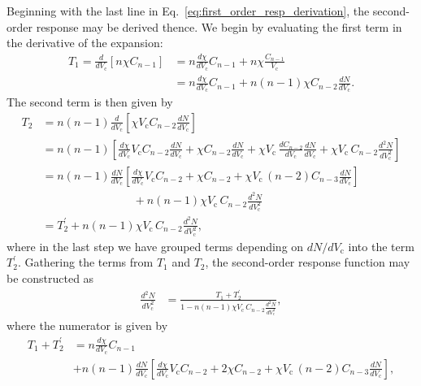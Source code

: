 Beginning with the last line in   
Eq.~\eqref{eq:first_order_resp_derivation}, 
the second-order response may be derived thence.
%
We begin by evaluating the 
first term in the derivative of the expansion:
%
\begin{align}
T_1=\frac{d}{dV_\textrm{c}}\left[n\chi C_{n-1}\right]
&=n\frac{d\chi}{dV_\textrm{c}}C_{n-1}+n\chi\frac{C_{n-1}}{V_\textrm{c}}\nonumber \\[1em]
&=n\frac{d\chi}{dV_\textrm{c}}C_{n-1}+n(n-1)\chi C_{n-2}\frac{dN}{dV_\textrm{c}}.
\end{align}
%
The second term is then given by
%
\begin{align}
T_2&=n(n-1)\frac{d}{dV_\textrm{c}}\left[\chi V_\textrm{c}C_{n-2}\frac{dN}{dV_\textrm{c}}\right] \nonumber \\[1em]
%
&=n(n-1)\left[\frac{d\chi}{dV_\textrm{c}}V_\textrm{c}C_{n-2}\frac{dN}{dV_\textrm{c}}
+ \chi C_{n-2}\frac{dN}{dV_\textrm{c}}\right.+\left.\chi V_\textrm{c}\,\frac{dC_{n-2}}{dV_\textrm{c}}\frac{dN}{dV_\textrm{c}}+\chi V_\textrm{c}\,C_{n-2}\frac{d^2N}{dV_\textrm{c}^2}\right] \nonumber  \\[1em]
%
&=n(n-1)\frac{dN}{dV_\textrm{c}}\left[\frac{d\chi}{dV_\textrm{c}}V_\textrm{c}C_{n-2}
+ \chi C_{n-2}
+\chi V_\textrm{c}\,(n-2)C_{n-3}\frac{dN}{dV_\textrm{c}}\right] \nonumber \\
&\qquad\qquad\qquad\qquad +n(n-1)\chi V_\textrm{c}\, C_{n-2}\frac{d^2N}{dV_\textrm{c}^2} \nonumber  \\[0.75em]
&=T_2^\prime + n(n-1)\chi V_\textrm{c}\, C_{n-2}\frac{d^2N}{dV_\textrm{c}^2},
\end{align}
%
where in the last step we have grouped terms 
depending on $dN/dV_\textrm{c}$ 
into the term $T_2^\prime$.
%
Gathering the terms from 
$T_1$ and $T_2$, 
the second-order response function 
may be constructed as 
%
\begin{align}
\frac{d^2N}{dV_\textrm{c}^2} &= \frac{T_1+T_2^\prime}{1-n(n-1)\chi V_\textrm{c}\, C_{n-2}\frac{d^2N}{dV_\textrm{c}^2}},
\label{second_order_resp}
\end{align}
%
where the numerator is given by
%
\begin{align}
\label{second_order_resp_numerator}
T_1+T_2^\prime &= 
n\frac{d\chi}{dV_\textrm{c}}C_{n-1}   \\[0.5em]
&+n(n-1)\frac{dN}{dV_\textrm{c}}\left[\frac{d\chi}{dV_\textrm{c}}V_\textrm{c}C_{n-2}\right.
+ \left. 2\chi C_{n-2} +\chi V_\textrm{c}\,(n-2)C_{n-3}\frac{dN}{dV_\textrm{c}}\right] \nonumber, 
\end{align} 
